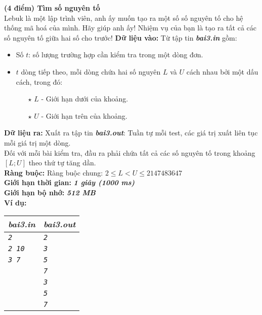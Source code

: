 \begin{ex}
	\textbf{(4 điểm) Tìm số nguyên tố}\\
	Lebuk là một lập trình viên, anh ấy muốn tạo ra một số số  nguyên tố cho hệ thống mã hoá của mình. Hãy giúp anh ấy! Nhiệm vụ của bạn là tạo ra tất cả các số nguyên tố giữa hai số cho trước!
	\textbf{Dữ liệu vào: } Từ tập tin \textbf{\textit{bai3.in}} gồm: 
	\begin{itemize}
		\item Số $t$: số lượng trường hợp cần kiểm tra trong một dòng đơn. 
		\item $t$ dòng tiếp theo, mỗi dòng chứa hai số nguyên $L$ và $U$ cách nhau bởi một dấu cách, trong đó: 
		\begin{itemize}
			\item[$\star$] $L$ - Giới hạn dưới của khoảng. 
			\item[$\star$] $U$ - Giới hạn trên của khoảng. 
		\end{itemize}
	\end{itemize}
	\textbf{Dữ liệu ra: } Xuất ra tập tin \textbf{\textit{bai3.out}}: Tuần tự mỗi test, các giá trị xuất liên tục mỗi giá trị một dòng. \\
	Đối với mỗi bài kiểm tra, đầu ra phải chứa tất cả các số nguyên tố trong khoảng $[L; U]$ theo thứ tự tăng dần. \\
	\textbf{Ràng buộc: } Ràng buộc chung: $2 \leq L < U \leq 2147483647$\\
	\textbf{Giới hạn thời gian: } \textbf{\textit{1 giây (1000 ms)}} \\
	\textbf{Giới hạn bộ nhớ: } \textbf{\textit{512 MB}}\\
	\textbf{Ví dụ: } 
	\begin{center}
		\begin{tabular}{|l|l|}
			\hline
			\textbf{\textsf{\textit{bai3.in}}} & \textbf{\textsf{\textit{bai3.out}}} \\ %
			\hline
			\textit{\texttt{2}} & \textit{\texttt{2}} \\ %
			\textit{\texttt{2 10}} & \textit{\texttt{3}} \\ %
			\textit{\texttt{3 7}} & \textit{\texttt{5}} \\ %
			 & \textit{\texttt{7}} \\ %
			 & \textit{\texttt{3}} \\
			 & \textit{\texttt{5}}\\
			 & \textit{\texttt{7}}\\
			\hline
		\end{tabular}
	\end{center}
\end{ex}


